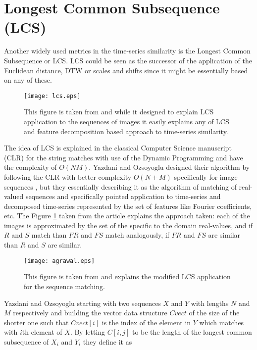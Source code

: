 \section{Longest Common Subsequence (LCS) } \label{lcs}
Another widely used metrics in the time-series similarity is the Longest Common Subsequence or LCS. LCS could be seen as the successor of the application of the Euclidean distance, DTW or scales and shifts \cite{citeulike:3816327} since it might be essentially based on any of these. 
\begin{figure}[tbp]
   \centering
   \texttt{[image: lcs.eps]}
   \caption{This figure is taken from \cite{citeulike:4367061} and while it designed to explain LCS application to the sequences of images it easily explains any of LCS and feature decomposition based approach to time-series similarity.}
   \label{fig:lcs}
\end{figure} 
The idea of LCS is explained in the classical Computer Science manuscript \cite{citeulike:180287} (CLR) for the string matches with use of the Dynamic Programming and have the complexity of $O(NM)$. Yazdani and Ozsoyoglu designed their algorithm by following the CLR with better complexity $O(N+M)$ specifically for image sequences \cite{citeulike:4367061}, but they essentially describing it as the algorithm of matching of real-valued sequences and specifically pointed application to time-series and decomposed time-series represented by the set of features like Fourier coefficients, etc. The Figure \ref{fig:lcs} taken from the article explains the approach taken: each of the images is approximated by the set of the specific to the domain real-values, and if $R$ and $S$ match than $FR$ and $FS$ match analogously, if $FR$ and $FS$ are similar than $R$ and $S$ are similar.

\begin{figure}[tbp]
   \centering
   \texttt{[image: agrawal.eps]}
   \caption{This figure is taken from \cite{citeulike:3816327} and explains the modified LCS application for the sequence matching.}
   \label{fig:agrawal_lcs}
\end{figure} 

Yazdani and Ozsoyoglu starting with two sequences $X$ and $Y$ with lengths $N$ and $M$ respectively and building the vector data structure $Cvect$ of the size of the shorter one such that $Cvect[i]$ is the index of the element in $Y$ which matches with $i$th element of $X$. By letting $C[i,j]$ to be the length of the longest common subsequence of $X_{i}$ and $Y_{i}$ they define it as 

